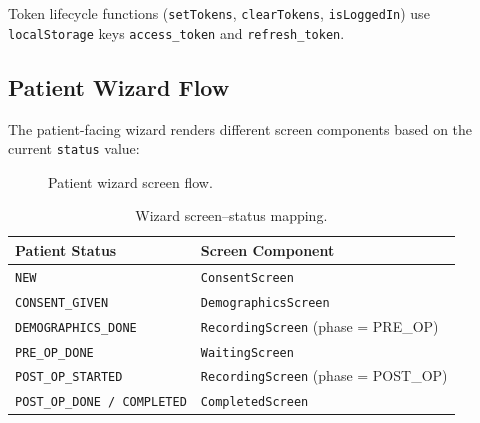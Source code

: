 \documentclass[12pt,a4paper]{article}
\begin{document}
Token lifecycle functions (\texttt{setTokens}, \texttt{clearTokens},
\texttt{isLoggedIn}) use \texttt{localStorage} keys \texttt{access\_token} and
\texttt{refresh\_token}.

\subsection{Patient Wizard Flow}
\label{sec:wizard}

The patient-facing wizard renders different screen components based on the
current \texttt{status} value:

\begin{figure}[H]
\centering
{}
\caption{Patient wizard screen flow.}
\label{fig:wizard}
\end{figure}

\begin{table}[H]
\centering
\caption{Wizard screen--status mapping.}
\begin{tabular}{l l}
\toprule
\textbf{Patient Status} & \textbf{Screen Component} \\
\midrule
\texttt{NEW}              & \texttt{ConsentScreen} \\
\texttt{CONSENT\_GIVEN}   & \texttt{DemographicsScreen} \\
\texttt{DEMOGRAPHICS\_DONE} & \texttt{RecordingScreen} (phase = PRE\_OP) \\
\texttt{PRE\_OP\_DONE}    & \texttt{WaitingScreen} \\
\texttt{POST\_OP\_STARTED} & \texttt{RecordingScreen} (phase = POST\_OP) \\
\texttt{POST\_OP\_DONE / COMPLETED} & \texttt{CompletedScreen} \\
\bottomrule
\end{tabular}
\end{table}
\end{document}
